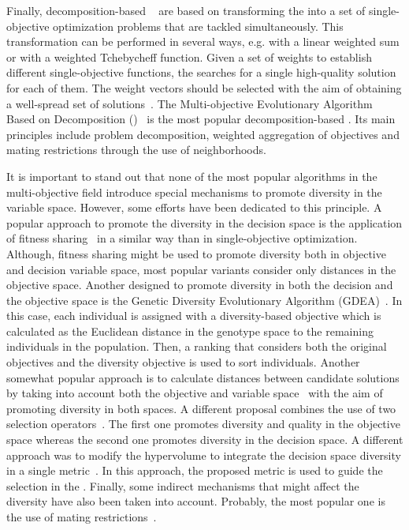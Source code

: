 Finally, decomposition-based \MOEAS{}~\cite{Joel:MOEAD_AMS} are based on transforming the \MOP{} into a set of 
single-objective optimization problems that are tackled simultaneously.
%
This transformation can be performed in several ways, e.g. with a linear weighted sum or with a weighted Tchebycheff function. 
%
Given a set of weights to establish different single-objective functions, the \MOEA{} searches for a single 
high-quality solution for each of them. 
%
The weight vectors should be selected with the aim of obtaining a well-spread set of solutions~\cite{Joel:Kalyanmoy}.
%
The Multi-objective Evolutionary Algorithm Based on Decomposition (\MOEAD{})~\cite{Joel:MOEAD} is the most popular 
decomposition-based \MOEA{}. 
%
Its main principles include problem decomposition, weighted aggregation of objectives and mating restrictions 
through the use of neighborhoods. 
%
%
%
 
It is important to stand out that none of the most popular algorithms in the multi-objective field introduce special 
mechanisms to promote diversity in the variable space.
%
However, some efforts have been dedicated to this principle.
%
A popular approach to promote the diversity in the decision space is the application of fitness sharing~\cite{Joel:NPGA} 
in a similar way than in single-objective optimization.
%
Although, fitness sharing might be used to promote diversity both in objective and decision variable space, most
popular variants consider only distances in the objective space.
%
Another \MOEA{} designed to promote diversity in both the decision and the objective space is the Genetic
Diversity Evolutionary Algorithm (GDEA)~\cite{toffolo2003genetic}.
%
In this case, each individual is assigned with a diversity-based objective which is calculated as the
Euclidean distance in the genotype space to the remaining individuals in the population.
%
Then, a ranking that considers both the original objectives and the diversity objective is used
to sort individuals.
%
Another somewhat popular approach is to calculate distances between candidate solutions by taking
into account both the objective and variable space~\cite{deb2005omni,shir2009enhancing} with the aim
of promoting diversity in both spaces.
%
A different proposal combines the use of two selection operators~\cite{chan2005evolutionary}.
%
The first one promotes diversity and quality in the objective space whereas the second one promotes diversity in the decision space.
%
A different approach was to modify the hypervolume to integrate the decision space diversity 
in a single metric~\cite{ulrich2010integrating}.
%
In this approach, the proposed metric is used to guide the selection in the \MOEA{}.
%
Finally, some indirect mechanisms that might affect the diversity have also been taken into account.
%
Probably, the most popular one is the use of mating restrictions~\cite{Joel:STUDY_MATTING_RESTRICTION,Joel:MOEAD_AMS}.

